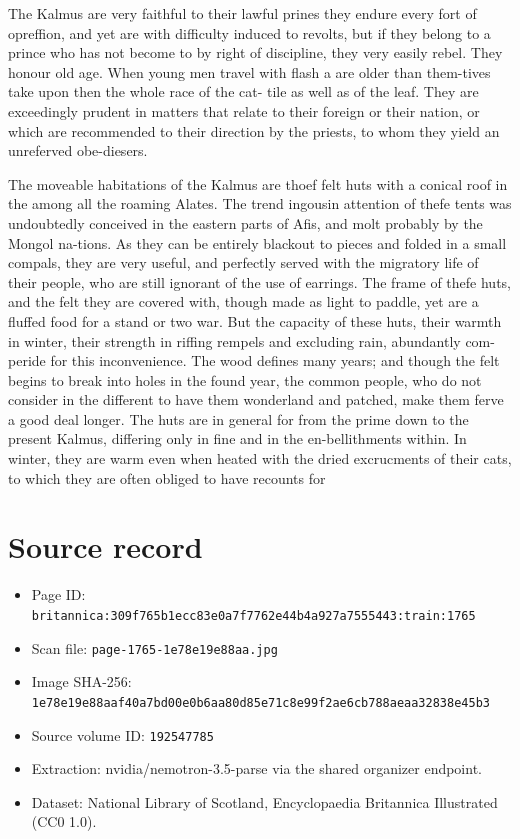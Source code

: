 \documentclass{article}
\begin{document}
The Kalmus are very faithful to their lawful prines they endure every fort of opreffion, and yet are with difficulty induced to revolts, but if they belong to a prince who has not become to by right of discipline, they very easily rebel. They honour old age. When young men travel with flash a are older than them-tives take upon then the whole race of the cat- tile as well as of the leaf. They are exceedingly prudent in matters that relate to their foreign or their nation, or which are recommended to their direction by the priests, to whom they yield an unreferved obe-diesers.

The moveable habitations of the Kalmus are thoef felt huts with a conical roof in the among all the roaming Alates. The trend ingousin attention of thefe tents was undoubtedly conceived in the eastern parts of Afis, and molt probably by the Mongol na-tions. As they can be entirely blackout to pieces and folded in a small compals, they are very useful, and perfectly served with the migratory life of their people, who are still ignorant of the use of earrings. The frame of thefe huts, and the felt they are covered with, though made as light to paddle, yet are a fluffed food for a stand or two war. But the capacity of these huts, their warmth in winter, their strength in riffing rempels and excluding rain, abundantly com-peride for this inconvenience. The wood defines many years; and though the felt begins to break into holes in the found year, the common people, who do not consider in the different to have them wonderland and patched, make them ferve a good deal longer. The huts are in general for from the prime down to the present Kalmus, differing only in fine and in the en-bellithments within. In winter, they are warm even when heated with the dried excrucments of their cats, to which they are often obliged to have recounts for

\section*{Source record}
\begin{itemize}
\item Page ID: \texttt{britannica:309f765b1ecc83e0a7f7762e44b4a927a7555443:train:1765}
\item Scan file: \texttt{page-1765-1e78e19e88aa.jpg}
\item Image SHA-256: \texttt{1e78e19e88aaf40a7bd00e0b6aa80d85e71c8e99f2ae6cb788aeaa32838e45b3}
\item Source volume ID: \texttt{192547785}
\item Extraction: nvidia/nemotron-3.5-parse via the shared organizer endpoint.
\item Dataset: National Library of Scotland, Encyclopaedia Britannica Illustrated (CC0 1.0).
\end{itemize}
\end{document}
